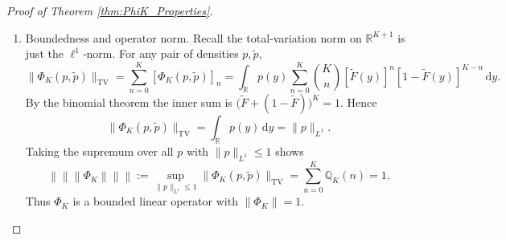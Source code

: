 \documentclass{article}
\newcommand{\triplenorm}[1]{%
  \left\lVert\!\!\left\lVert\!\!\left\lVert #1 
  \right\rVert\!\!\right\rVert\!\!\right\rVert
}
\begin{document}
\begin{proof}[Proof of Theorem \ref{thm:PhiK_Properties}]
\begin{enumerate}[label=(\roman*)]
    \item Boundedness and operator norm.  
    Recall the total‐variation norm on \(\mathbb{R}^{K+1}\) is just the \(\ell^1\)‐norm.  For any pair of densities \(p, \tilde{p}\),
    \[
    \|\Phi_K(p,\tilde p)\|_{\mathrm{TV}}
    =\sum_{n=0}^K[\Phi_K(p,\tilde p)]_n
    =\int_{\mathbb{R}}p(y)\sum_{n=0}^K\binom{K}{n}[\tilde F(y)]^n[1-\tilde F(y)]^{K-n}\,\mathrm{d} y.
    \]
    By the binomial theorem the inner sum is \(\bigl(\tilde F+(1-\tilde F)\bigr)^K=1\).  Hence
    \[
    \|\Phi_K(p,\tilde p)\|_{\mathrm{TV}}
    =\int_{\mathbb{R}}p(y)\,\mathrm{d} y
    =\|p\|_{L^1}.
    \]
    Taking the supremum over all \(p\) with \(\|p\|_{L^1}\le1\) shows
    \[
    \triplenorm{\Phi_K} := \sup_{\|p\|_{L^1}\le1}\|\Phi_K(p,\tilde p)\|_{\mathrm{TV}} = \sum_{n=0}^{K} \mathbb{Q}_{K}(n)
    =1.
    \]
    Thus \(\Phi_K\) is a bounded linear operator with \(\|\Phi_K\|=1\).
    \end{enumerate}
\end{proof}
\end{document}
